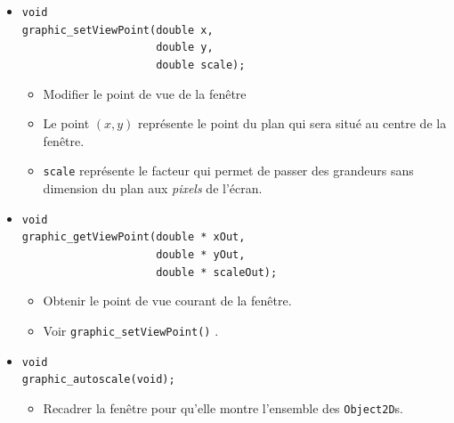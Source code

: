 \documentclass[12pt]{article}
\begin{document}
\begin{itemize}
\begin{itemize}
      \end{itemize}
\item \verb!void! \\
      \verb!graphic_setViewPoint(double x,! \\
      \verb!                     double y,! \\
      \verb!                     double scale);!
      \begin{itemize}
      \item Modifier le point de vue de la fen\^etre
      \item Le point $(x,y)$ repr\'esente le point du plan qui sera situ\'e
            au centre de la fen\^etre.
      \item \verb!scale! repr\'esente le facteur qui permet de passer des
            grandeurs sans dimension du plan aux \textit{pixels} de l'\'ecran.
      \end{itemize}
\item \verb!void! \\
      \verb!graphic_getViewPoint(double * xOut,! \\
      \verb!                     double * yOut,! \\
      \verb!                     double * scaleOut);!
      \begin{itemize}
      \item Obtenir le point de vue courant de la fen\^etre.
      \item Voir \verb!graphic_setViewPoint()! .
      \end{itemize}
\item \verb!void! \\
      \verb!graphic_autoscale(void);!
      \begin{itemize}
      \item Recadrer la fen\^etre pour qu'elle montre
            l'ensemble des \verb!Object2D!s.
      \end{itemize}
\end{itemize}
\newpage
\end{document}
